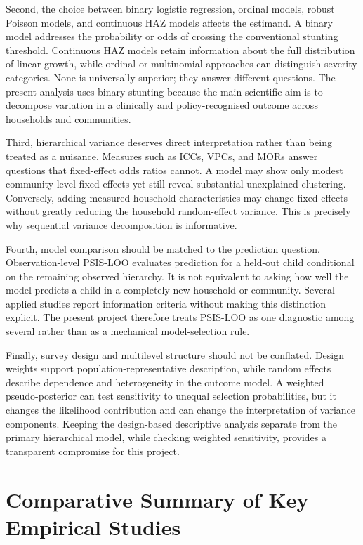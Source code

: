 Second, the choice between binary logistic regression, ordinal models, robust Poisson models, and continuous HAZ models affects the estimand. A binary model addresses the probability or odds of crossing the conventional stunting threshold. Continuous HAZ models retain information about the full distribution of linear growth, while ordinal or multinomial approaches can distinguish severity categories. None is universally superior; they answer different questions. The present analysis uses binary stunting because the main scientific aim is to decompose variation in a clinically and policy-recognised outcome across households and communities.

Third, hierarchical variance deserves direct interpretation rather than being treated as a nuisance. Measures such as ICCs, VPCs, and MORs answer questions that fixed-effect odds ratios cannot. A model may show only modest community-level fixed effects yet still reveal substantial unexplained clustering. Conversely, adding measured household characteristics may change fixed effects without greatly reducing the household random-effect variance. This is precisely why sequential variance decomposition is informative.

Fourth, model comparison should be matched to the prediction question. Observation-level PSIS-LOO evaluates prediction for a held-out child conditional on the remaining observed hierarchy. It is not equivalent to asking how well the model predicts a child in a completely new household or community. Several applied studies report information criteria without making this distinction explicit. The present project therefore treats PSIS-LOO as one diagnostic among several rather than as a mechanical model-selection rule.

Finally, survey design and multilevel structure should not be conflated. Design weights support population-representative description, while random effects describe dependence and heterogeneity in the outcome model. A weighted pseudo-posterior can test sensitivity to unequal selection probabilities, but it changes the likelihood contribution and can change the interpretation of variance components. Keeping the design-based descriptive analysis separate from the primary hierarchical model, while checking weighted sensitivity, provides a transparent compromise for this project.

\section{Comparative Summary of Key Empirical Studies}

